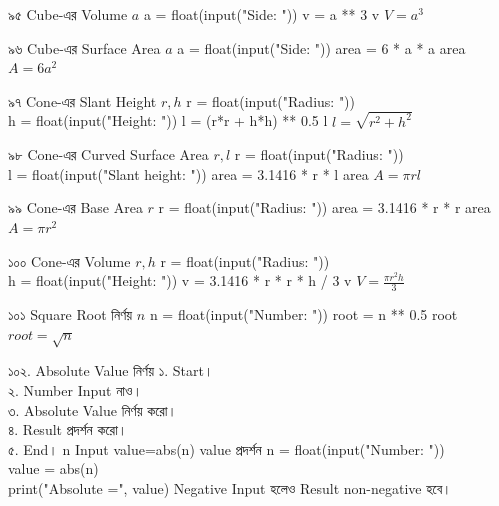
\formulaexercise
{৯৫}
{Cube-এর Volume}
{\(a\)}
{a = float(input("Side: "))}
{v = a ** 3}
{v}
{\(V=a^3\)}


\formulaexercise
{৯৬}
{Cube-এর Surface Area}
{\(a\)}
{a = float(input("Side: "))}
{area = 6 * a * a}
{area}
{\(A=6a^2\)}


\formulaexercise
{৯৭}
{Cone-এর Slant Height}
{\(r,h\)}
{r = float(input("Radius: "))\\
h = float(input("Height: "))}
{l = (r*r + h*h) ** 0.5}
{l}
{\(l=\sqrt{r^2+h^2}\)}


\formulaexercise
{৯৮}
{Cone-এর Curved Surface Area}
{\(r,l\)}
{r = float(input("Radius: "))\\
l = float(input("Slant height: "))}
{area = 3.1416 * r * l}
{area}
{\(A=\pi rl\)}


\formulaexercise
{৯৯}
{Cone-এর Base Area}
{\(r\)}
{r = float(input("Radius: "))}
{area = 3.1416 * r * r}
{area}
{\(A=\pi r^2\)}


\formulaexercise
{১০০}
{Cone-এর Volume}
{\(r,h\)}
{r = float(input("Radius: "))\\
h = float(input("Height: "))}
{v = 3.1416 * r * r * h / 3}
{v}
{\(V=\frac{\pi r^2h}{3}\)}


\formulaexercise
{১০১}
{Square Root নির্ণয়}
{\(n\)}
{n = float(input("Number: "))}
{root = n ** 0.5}
{root}
{\(root=\sqrt n\)}


\exerciseTable
{১০২. Absolute Value নির্ণয়}
{
১. Start।\\
২. Number Input নাও।\\
৩. Absolute Value নির্ণয় করো।\\
৪. Result প্রদর্শন করো।\\
৫. End।
}
{
\linearflow
{n Input}
{value=abs(n)}
{value প্রদর্শন}
}
{
n = float(input("Number: "))\\
value = abs(n)\\
print("Absolute =", value)
}
{
Negative Input হলেও Result non-negative হবে।
}

